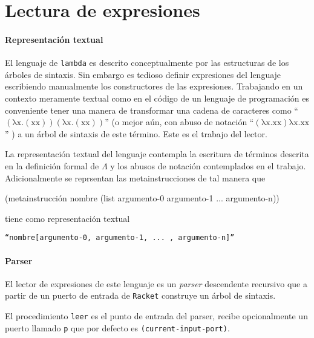 \nwenddocs{}\section*{Lectura de expresiones}

\paragraph{Representación textual} El lenguaje de {\tt{}lambda} es descrito conceptualmente por las estructuras de los árboles de sintaxis. Sin embargo es tedioso definir expresiones del lenguaje escribiendo manualmente los constructores de las expresiones. Trabajando en un contexto meramente textual como en el código de un lenguaje de programación es conveniente tener una manera de transformar una cadena de caracteres como ``\( \mathrm{(λx.(x x))(λx.(x x))} \)'' (o mejor aún, con abuso de notación ``\( \mathrm{(λx.x x) λx.x x} \)'' ) a un árbol de sintaxis de este término. Este es el trabajo del lector.

La representación textual del lenguaje contempla la escritura de términos descrita en la definición formal de \( Λ \) y los abusos de notación contemplados en el trabajo. Adicionalmente se reprsentan las metainstrucciones de tal manera que

\nwenddocs{}\endmoddef
(metainstrucción nombre (list argumento-0 argumento-1 ... argumento-n))
\nwendcode{}\nwdocspar

tiene como representación textual

{\tt{}``nombre[argumento-0,\ argumento-1,\ ...\ ,\ argumento-n]''}

\paragraph{Parser} El lector de expresiones de este lenguaje es un \emph{parser} descendente recursivo que a partir de un puerto de entrada de {\tt{}Racket} construye un árbol de sintaxis.

El procedimiento {\tt{}\protect{}leer} es el punto de entrada del parser, recibe opcionalmente un puerto llamado {\tt{}p} que por defecto es {\tt{}(current-input-port)}.

